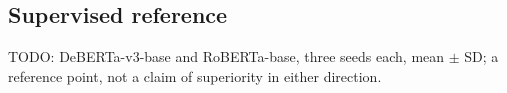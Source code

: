 \subsection{Supervised reference}
TODO: DeBERTa-v3-base and RoBERTa-base, three seeds each, mean $\pm$ SD; a reference point, not a claim of
superiority in either direction.

